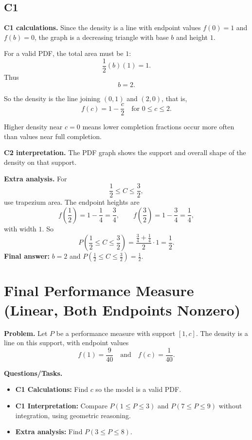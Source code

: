 	\subsection*{C1}
	
	\textbf{C1 calculations.}
	Since the density is a line with endpoint values $f(0)=1$ and $f(b)=0$, the graph is a decreasing triangle with base $b$ and height $1$.
	
	For a valid PDF, the total area must be $1$:
	\[
	\frac12(b)(1)=1.
	\]
	Thus
	\[
	b=2.
	\]
	
	So the density is the line joining $(0,1)$ and $(2,0)$, that is,
	\[
	f(c)=1-\frac{c}{2}\quad\text{for }0\le c\le 2.
	\]
	
	Higher density near $c=0$ means lower completion fractions occur more often than values near full completion.
	
	\textbf{C2 interpretation.}
	The PDF graph shows the support and overall shape of the density on that support.
	
	\textbf{Extra analysis.}
	For
	\[
	\frac12\le C\le\frac32,
	\]
	use trapezium area. The endpoint heights are
	\[
	f\!\left(\frac12\right)=1-\frac14=\frac34,
	\qquad
	f\!\left(\frac32\right)=1-\frac34=\frac14,
	\]
	with width $1$. So
	\[
	P\!\left(\frac12\le C\le\frac32\right)
	=
	\frac{\frac34+\frac14}{2}\cdot1
	=
	\frac12.
	\]
	\textbf{Final answer:} $b=2$ and $P\!\left(\frac12\le C\le\frac32\right)=\frac12$.
	\section{Final Performance Measure (Linear, Both Endpoints Nonzero)}
	
	\textbf{Problem.}
	Let $P$ be a performance measure with support $[1,c]$. The density is a line on this support, with endpoint values
	\[
	f(1)=\frac{9}{40}
	\quad\text{and}\quad
	f(c)=\frac{1}{40}.
	\]
	
	\textbf{Questions/Tasks.}
	\begin{itemize}
		\item \textbf{C1 Calculations:} Find $c$ so the model is a valid PDF.
		\item \textbf{C1 Interpretation:} Compare $P(1\le P\le 3)$ and $P(7\le P\le 9)$ without integration, using geometric reasoning.
		\item \textbf{Extra analysis:} Find $P(3\le P\le 8)$.
	\end{itemize}
	
